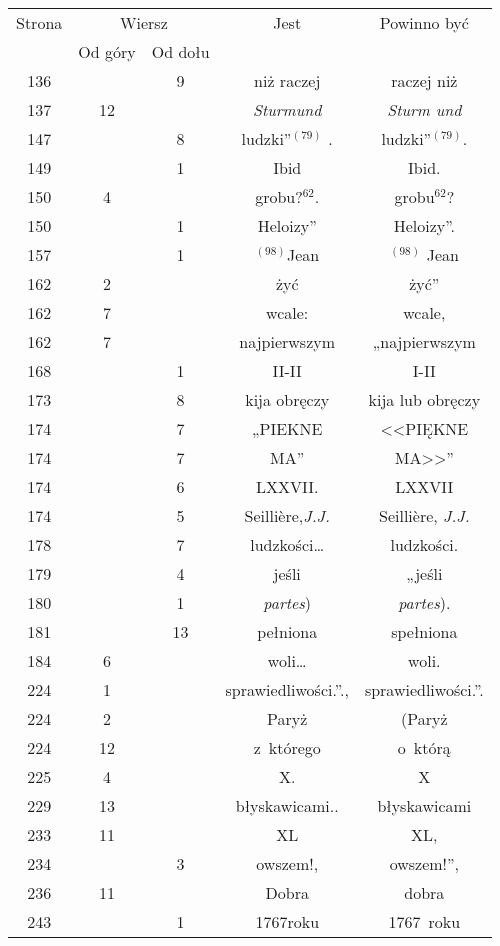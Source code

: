 \documentclass[a4paper,11pt]{article}
\begin{document}
\begin{center}
  \begin{tabular}{|c|c|c|c|c|}
    \hline
    Strona & \multicolumn{2}{c|}{Wiersz} & Jest
                              & Powinno być \\ \cline{2-3}
    & Od góry & Od dołu & & \\
    \hline
    136 & &  9 & niż raczej & raczej niż \\
    137 & 12 & & \textit{Sturmund} & \textit{Sturm und} \\
    147 & &  8 & ludzki”$^{ ( 79 ) }$ . & ludzki”$^{ ( 79 ) }$. \\
    149 & &  1 & Ibid & Ibid. \\
    150 &  4 & & grobu?$^{ 62 }$. & grobu$^{ 62 }$? \\
    150 & &  1 & Heloizy” & Heloizy”. \\
    157 & &  1 & $^{ ( 98 ) }$Jean & $^{ ( 98 ) }$ Jean \\
    162 &  2 & & żyć & żyć” \\
    162 &  7 & & wcale: & wcale, \\
    162 &  7 & & najpierwszym & „najpierwszym \\
    168 & &  1 & II-II & I-II \\
    173 & &  8 & kija obręczy & kija lub obręczy \\
    174 & &  7 & „PIEKNE & <<PIĘKNE  %
    \\
    174 & &  7 & {\footnotesize MA}” & {\footnotesize MA}>>” \\
    174 & &  6 & LXXVII. & LXXVII \\
    174 & &  5 & Seilli\`{e}re,\textit{J.J.}
           & Seilli\`{e}re, \textit{J.J.} \\
    178 & &  7 & ludzkości\ldots & ludzkości. \\
    179 & &  4 & jeśli & „jeśli \\
    180 & &  1 & \textit{partes}) & \textit{partes}). \\
    181 & & 13 & pełniona & spełniona \\
    184 &  6 & & woli\ldots & woli. \\
    224 &  1 & & sprawiedliwości.”., & sprawiedliwości.”. \\
    224 &  2 & & Paryż & (Paryż \\
    224 & 12 & & z~którego & o~którą \\
    225 &  4 & & X. & X \\
    229 & 13 & & błyskawicami.. & błyskawicami \\
    233 & 11 & & XL & XL, \\
    234 & &  3 & owszem!, & owszem!”, \\
    236 & 11 & & Dobra & dobra \\
    243 & &  1 & 1767roku & 1767~roku \\
    \hline
  \end{tabular}

\end{center}
\end{document}
